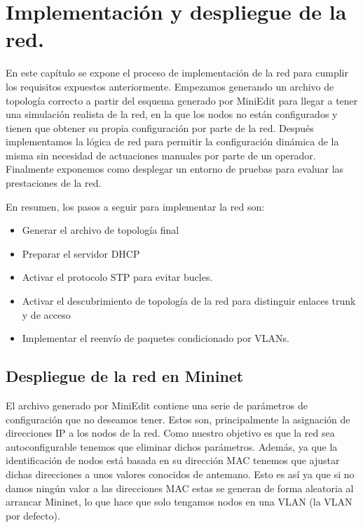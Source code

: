 \chapter{Implementación y despliegue de la red.}

En este capítulo se expone el proceso de implementación de la red para cumplir los requisitos expuestos anteriormente. Empezamos generando un archivo de topología correcto a partir del esquema generado por MiniEdit para llegar a tener una simulación realista de la red, en la que los nodos no están configurados y tienen que obtener su propia configuración por parte de la red. Después implementamos la lógica de red para permitir la configuración dinámica de la misma sin necesidad de actuaciones manuales por parte de un operador. Finalmente exponemos como desplegar un entorno de pruebas para evaluar las prestaciones de la red.

En resumen, los pasos a seguir para implementar la red son:

\begin{itemize}
    \item Generar el archivo de topología final
    \item Preparar el servidor DHCP
    \item Activar el protocolo STP para evitar bucles.
    \item Activar el descubrimiento de topología de la red para distinguir enlaces trunk y de acceso
    \item Implementar el reenvío de paquetes condicionado por VLANs.
\end{itemize}


\section{Despliegue de la red en Mininet}

El archivo generado por MiniEdit contiene una serie de parámetros de configuración que no deseamos tener. Estos son, principalmente la asignación de direcciones IP a los nodos de la red. Como nuestro objetivo es que la red sea autoconfigurable tenemos que eliminar dichos parámetros. Además, ya que la identificación de nodos está basada en su dirección MAC tenemos que ajustar dichas direcciones a unos valores conocidos de antemano. Esto es así ya que si no damos ningún valor a las direcciones MAC estas se generan de forma aleatoria al arrancar Mininet, lo que hace que solo tengamos nodos en una VLAN (la VLAN por defecto).


